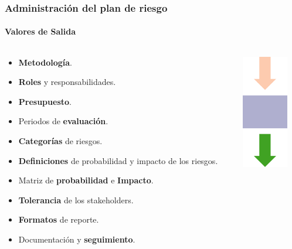\begin{frame}
\frametitle{Administración del plan de riesgo}
\framesubtitle{Valores de Salida}
\begin{columns}
	\begin{column}{0.8\textwidth}
\begin{itemize}
    \item<1-> \textbf{Metodología}.
    \item<2-> \textbf{Roles} y responsabilidades.
    \item<3-> \textbf{Presupuesto}.
    \item<4-> Periodos de \textbf{evaluación}.
    \item<5-> \textbf{Categorías} de riesgos.
    \item<6-> \textbf{Definiciones} de probabilidad y impacto de los riesgos.
    \item<7-> Matriz de \textbf{probabilidad} e \textbf{Impacto}.
    \item<8-> \textbf{Tolerancia} de los stakeholders.
    \item<9-> \textbf{Formatos} de reporte.
    \item<10-> Documentación y \textbf{seguimiento}.
\end{itemize}
	\end{column}
	\begin{column}{0.2\textwidth}
		\includegraphics[width=2cm]{img/output}
	\end{column}
\end{columns}
\end{frame}
